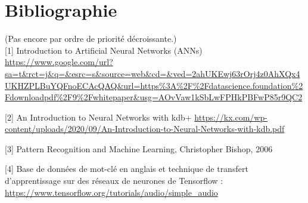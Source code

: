 \documentclass[12pt,a4paper, french]{article}
\begin{document}
\section*{Bibliographie}
(Pas encore par ordre de priorité décroissante.)\\ 

[1]
Introduction to Artificial Neural Networks
(ANNs)
\url{https://www.google.com/url?sa=t&rct=j&q=&esrc=s&source=web&cd=&ved=2ahUKEwj63rOrj4z0AhXQx4UKHZPLBuYQFnoECAcQAQ&url=https%
}

[2]
An Introduction to Neural Networks
with kdb+
\url{https://kx.com/wp-content/uploads/2020/09/An-Introduction-to-Neural-Networks-with-kdb.pdf}

[3]
Pattern Recognition and Machine Learning, Christopher Bishop, 2006

[4]
Base de données de mot-clé en anglais et technique de transfert d'apprentissage sur des réseaux de neurones de Tensorflow : \url{https://www.tensorflow.org/tutorials/audio/simple_audio}
\end{document}
